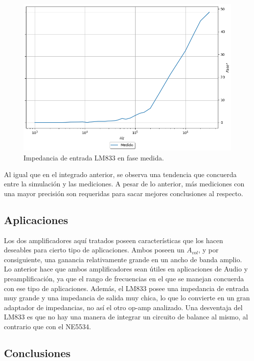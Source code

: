 \begin{figure}[H]	
	\centering
	\includegraphics[width=\textwidth]{Ejercicio2/Imagenes/Zin_F_NE5534_Medido.png}
	\caption{Impedancia de entrada LM833 en fase medida.}
\end{figure}

Al igual que en el integrado anterior, se observa una tendencia que concuerda entre la simulación y las mediciones. A pesar de lo anterior, más mediciones con una mayor precisión son requeridas para sacar mejores conclusiones al respecto.
\subsection{Aplicaciones}
Los dos amplificadores aquí tratados poseen características que los hacen deseables para cierto tipo de aplicaciones. Ambos poseen un $A_{vol}$, y por consiguiente, una ganancia relativamente grande en un ancho de banda amplio. Lo anterior hace que ambos amplificadores sean útiles en aplicaciones de Audio y preamplificación, ya que el rango de frecuencias en el que se manejan concuerda con ese tipo de aplicaciones. Además, el LM833 posee una impedancia de entrada muy grande y una impedancia de salida muy chica, lo que lo convierte en un gran adaptador de impedancias, no así el otro op-amp analizado. Una desventaja del LM833 es que no hay una manera de integrar un circuito de balance al mismo, al contrario que con el NE5534. 


\subsection{Conclusiones}


